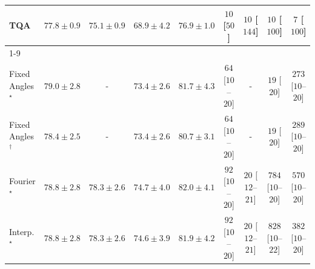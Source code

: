 \begin{tabular}{l|cccc|cccc|}
TQA & {\cellcolor[HTML]{258745}} \color[HTML]{F1F1F1} $77.8\pm 0.9$ & {\cellcolor[HTML]{58B669}} \color[HTML]{F1F1F1} $75.1\pm 0.9$ & {\cellcolor[HTML]{E8F6AE}} \color[HTML]{000000} $68.9\pm 4.2$ & {\cellcolor[HTML]{329850}} \color[HTML]{F1F1F1} $76.9\pm 1.0$ & {\cellcolor[HTML]{FFF7F3}} \color[HTML]{000000} $10$ [$50$] & {\cellcolor[HTML]{FFF7F3}} \color[HTML]{000000} $10$ [$144$] & {\cellcolor[HTML]{FFF7F3}} \color[HTML]{000000} $10$ [$100$] & {\cellcolor[HTML]{FFF7F3}} \color[HTML]{000000} $7$ [$100$] \\
\cline{1-9}
\multicolumn{9}{c}{\rule{0pt}{8pt}SV} \\
\midrule
Fixed Angles$^\star$ & {\cellcolor[HTML]{04649E}} \color[HTML]{F1F1F1} $79.0\pm 2.8$ & {\cellcolor[HTML]{000000}} \color[HTML]{F1F1F1} {\cellcolor{white}} \color{black} - & {\cellcolor[HTML]{80AED2}} \color[HTML]{F1F1F1} $73.4\pm 2.6$ & {\cellcolor[HTML]{023C5F}} \color[HTML]{F1F1F1} $81.7\pm 4.3$ & {\cellcolor[HTML]{FEEBE7}} \color[HTML]{000000} $64$ [$10$--$20$] & {\cellcolor[HTML]{000000}} \color[HTML]{F1F1F1} {\cellcolor{white}} \color{black} - & {\cellcolor[HTML]{FFF5F1}} \color[HTML]{000000} $19$ [$20$] & {\cellcolor[HTML]{FBAFBA}} \color[HTML]{000000} $273$ [$10$--$20$] \\
Fixed Angles$^\dagger$ & {\cellcolor[HTML]{056BA7}} \color[HTML]{F1F1F1} $78.4\pm 2.5$ & {\cellcolor[HTML]{000000}} \color[HTML]{F1F1F1} {\cellcolor{white}} \color{black} - & {\cellcolor[HTML]{80AED2}} \color[HTML]{F1F1F1} $73.4\pm 2.6$ & {\cellcolor[HTML]{034D79}} \color[HTML]{F1F1F1} $80.7\pm 3.1$ & {\cellcolor[HTML]{FEEBE7}} \color[HTML]{000000} $64$ [$10$--$20$] & {\cellcolor[HTML]{000000}} \color[HTML]{F1F1F1} {\cellcolor{white}} \color{black} - & {\cellcolor[HTML]{FFF5F1}} \color[HTML]{000000} $19$ [$20$] & {\cellcolor[HTML]{FBA9B8}} \color[HTML]{000000} $289$ [$10$--$20$] \\
Fourier$^\star$ & {\cellcolor[HTML]{0567A1}} \color[HTML]{F1F1F1} $78.8\pm 2.8$ & {\cellcolor[HTML]{056CAA}} \color[HTML]{F1F1F1} $78.3\pm 2.6$ & {\cellcolor[HTML]{5C9FC9}} \color[HTML]{F1F1F1} $74.7\pm 4.0$ & {\cellcolor[HTML]{023858}} \color[HTML]{F1F1F1} $82.0\pm 4.1$ & {\cellcolor[HTML]{FDE4E1}} \color[HTML]{000000} $92$ [$10$--$20$] & {\cellcolor[HTML]{FFF4F0}} \color[HTML]{000000} $20$ [$12$--$21$] & {\cellcolor[HTML]{5D006F}} \color[HTML]{F1F1F1} $784$ [$10$--$20$] & {\cellcolor[HTML]{C61B8B}} \color[HTML]{F1F1F1} $570$ [$10$--$20$] \\
Interp.$^\star$ & {\cellcolor[HTML]{0567A1}} \color[HTML]{F1F1F1} $78.8\pm 2.8$ & {\cellcolor[HTML]{056CAA}} \color[HTML]{F1F1F1} $78.3\pm 2.6$ & {\cellcolor[HTML]{5EA0CA}} \color[HTML]{F1F1F1} $74.6\pm 3.9$ & {\cellcolor[HTML]{02395A}} \color[HTML]{F1F1F1} $81.9\pm 4.2$ & {\cellcolor[HTML]{FDE4E1}} \color[HTML]{000000} $92$ [$10$--$20$] & {\cellcolor[HTML]{FFF4F0}} \color[HTML]{000000} $20$ [$12$--$21$] & {\cellcolor[HTML]{49006A}} \color[HTML]{F1F1F1} $828$ [$10$--$22$] & {\cellcolor[HTML]{F87CA8}} \color[HTML]{F1F1F1} $382$ [$10$--$20$] \\

\end{tabular}
